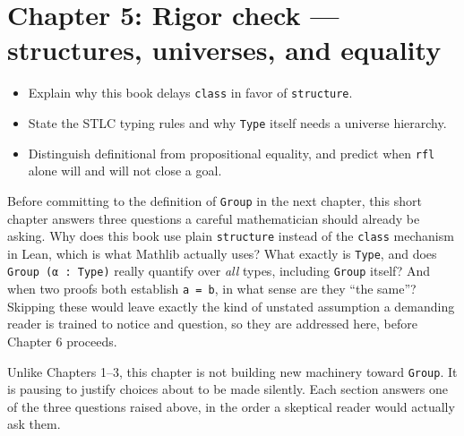 \chapter{Chapter 5: Rigor check --- structures, universes, and equality}\label{sec:05-rigor-check:00-index:1}

\begin{learningobjectives}
\begin{itemize}
\tightlist
\item
  Explain why this book delays \texttt{class} in favor of \texttt{structure}.
\item
  State the STLC typing rules and why \texttt{Type} itself needs a universe hierarchy.
\item
  Distinguish definitional from propositional equality, and predict when \texttt{rfl} alone will and will not close a goal.
\end{itemize}
\end{learningobjectives}


Before committing to the definition of \texttt{Group} in the next chapter, this short chapter answers three questions a careful mathematician should already be asking. Why does this book use plain \texttt{structure} instead of the \texttt{class} mechanism in Lean, which is what Mathlib actually uses? What exactly is \texttt{Type}, and does \texttt{Group (α : Type)} really quantify over \emph{all} types, including \texttt{Group} itself? And when two proofs both establish \texttt{a = b}, in what sense are they ``the same''? Skipping these would leave exactly the kind of unstated assumption a demanding reader is trained to notice and question, so they are addressed here, before Chapter 6 proceeds.

Unlike Chapters 1--3, this chapter is not building new machinery toward \texttt{Group}. It is pausing to justify choices about to be made silently. Each section answers one of the three questions raised above, in the order a skeptical reader would actually ask them.

